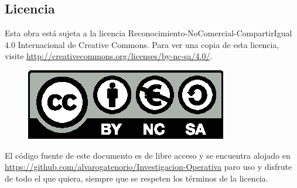 \subsection*{Licencia}
Esta obra está sujeta a la licencia Reconocimiento-NoComercial-CompartirIgual 4.0 Internacional de Creative Commons. Para ver una copia de esta licencia, visite \url{http://creativecommons.org/licenses/by-nc-sa/4.0/}.
\begin{figure}[h]
	\centering
	\includegraphics[scale=1]{img/licencia}
\end{figure}

El código fuente de este documento es de libre acceso y se encuentra alojado en \url{https://github.com/alvarogatenorio/Investigacion-Operativa} paro uso y disfrute de todo el que quiera, siempre que se respeten los términos de la licencia.